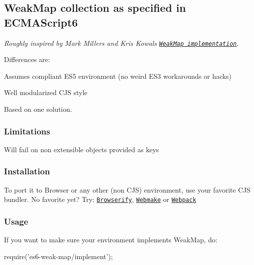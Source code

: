 \subsection*{Weak\+Map collection as specified in E\+C\+M\+A\+Script6}

{\itshape Roughly inspired by Mark Miller\textquotesingle{}s and Kris Kowal\textquotesingle{}s \href{https://github.com/drses/weak-map}{\tt Weak\+Map implementation}}.

Differences are\+:
\begin{DoxyItemize}
\item Assumes compliant E\+S5 environment (no weird E\+S3 workarounds or hacks)
\item Well modularized C\+JS style
\item Based on one solution.
\end{DoxyItemize}

\subsubsection*{Limitations}


\begin{DoxyItemize}
\item Will fail on non extensible objects provided as keys
\end{DoxyItemize}

\subsubsection*{Installation}



To port it to Browser or any other (non C\+JS) environment, use your favorite C\+JS bundler. No favorite yet? Try\+: \href{http://browserify.org/}{\tt Browserify}, \href{https://github.com/medikoo/modules-webmake}{\tt Webmake} or \href{http://webpack.github.io/}{\tt Webpack}

\subsubsection*{Usage}

If you want to make sure your environment implements {\ttfamily Weak\+Map}, do\+:


\begin{DoxyCode}
require('es6-weak-map/implement');
\end{DoxyCode}


